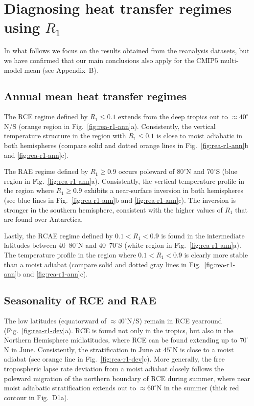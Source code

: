 \documentclass{ametsocV5}
\begin{document}
\section{Diagnosing heat transfer regimes using $R_1$} \label{sec:diagnostics}

    In what follows we focus on the results obtained from the reanalysis datasets, but we have confirmed that our main conclusions also apply for the CMIP5 multi-model mean (see Appendix~B).

    \subsection{Annual mean heat transfer regimes}

    The RCE regime defined by $R_1 \le 0.1$ extends from the deep tropics out to $\approx40^\circ$N/S (orange region in Fig.~\ref{fig:rea-r1-ann}a). Consistently, the vertical temperature structure in the region with $R_1 \le 0.1$ is close to moist adiabatic in both hemispheres (compare solid and dotted orange lines in Fig.~\ref{fig:rea-r1-ann}b and \ref{fig:rea-r1-ann}c).

    The RAE regime defined by $R_1 \ge 0.9$ occurs poleward of $80^\circ$N and $70^\circ$S (blue region in Fig.~\ref{fig:rea-r1-ann}a). Consistently, the vertical temperature profile in the region where $R_1 \ge 0.9$ exhibits a near-surface inversion in both hemispheres (see blue lines in Fig.~\ref{fig:rea-r1-ann}b and \ref{fig:rea-r1-ann}c). The inversion is stronger in the southern hemisphere, consistent with the higher values of $R_1$ that are found over Antarctica.

    Lastly, the RCAE regime defined by $0.1 < R_1 < 0.9$ is found in the intermediate latitudes between $40$--$80^\circ$N and $40$--$70^\circ$S (white region in Fig.~\ref{fig:rea-r1-ann}a). The temperature profile in the region where $0.1 < R_1 < 0.9$ is clearly more stable than a moist adiabat (compare solid and dotted gray lines in Fig.~\ref{fig:rea-r1-ann}b and \ref{fig:rea-r1-ann}c).

    \subsection{Seasonality of RCE and RAE} \label{subsec:seasonality}

    The low latitudes (equatorward of $\approx 40^\circ$N/S) remain in RCE yearround (Fig.~\ref{fig:rea-r1-dev}a). RCE is found not only in the tropics, but also in the Northern Hemisphere midlatitudes, where RCE can be found extending up to $70^\circ$N in June. Consistently, the stratification in June at $45^\circ$N is close to a moist adiabat (see orange line in Fig.~\ref{fig:rea-r1-dev}c). More generally, the free tropospheric lapse rate deviation from a moist adiabat closely follows the poleward migration of the northern boundary of RCE during summer, where near moist adiabatic stratification extends out to $\approx 60^\circ$N in the summer (thick red contour in Fig.~D1a).
\end{document}
